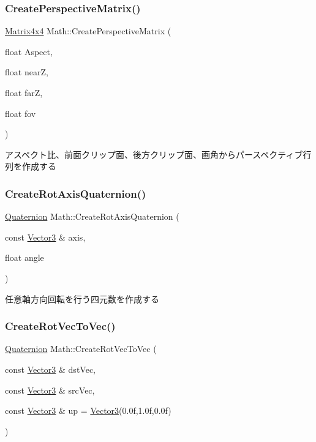 \subsubsection{\texorpdfstring{Create\+Perspective\+Matrix()}{CreatePerspectiveMatrix()}}
{\footnotesize\ttfamily \mbox{\hyperlink{struct_math_1_1_matrix4x4}{Matrix4x4}} Math\+::\+Create\+Perspective\+Matrix (\begin{DoxyParamCaption}\item[{float}]{Aspect,  }\item[{float}]{nearZ,  }\item[{float}]{farZ,  }\item[{float}]{fov }\end{DoxyParamCaption})}



アスペクト比、前面クリップ面、後方クリップ面、画角からパースペクティブ行列を作成する 

\mbox{\label{namespace_math_a75a9db6fc0b36439d59d46bc89b2f254}} 
\subsubsection{\texorpdfstring{Create\+Rot\+Axis\+Quaternion()}{CreateRotAxisQuaternion()}}
{\footnotesize\ttfamily \mbox{\hyperlink{struct_math_1_1_quaternion}{Quaternion}} Math\+::\+Create\+Rot\+Axis\+Quaternion (\begin{DoxyParamCaption}\item[{const \mbox{\hyperlink{struct_math_1_1_vector3}{Vector3}} \&}]{axis,  }\item[{float}]{angle }\end{DoxyParamCaption})}



任意軸方向回転を行う四元数を作成する 

\mbox{\label{namespace_math_adc7f7b4f59532bf2b31aebf97743c8a9}} 
\subsubsection{\texorpdfstring{Create\+Rot\+Vec\+To\+Vec()}{CreateRotVecToVec()}}
{\footnotesize\ttfamily \mbox{\hyperlink{struct_math_1_1_quaternion}{Quaternion}} Math\+::\+Create\+Rot\+Vec\+To\+Vec (\begin{DoxyParamCaption}\item[{const \mbox{\hyperlink{struct_math_1_1_vector3}{Vector3}} \&}]{dst\+Vec,  }\item[{const \mbox{\hyperlink{struct_math_1_1_vector3}{Vector3}} \&}]{src\+Vec,  }\item[{const \mbox{\hyperlink{struct_math_1_1_vector3}{Vector3}} \&}]{up = {\ttfamily \mbox{\hyperlink{struct_math_1_1_vector3}{Vector3}}(0.0f,1.0f,0.0f)} }\end{DoxyParamCaption})}

